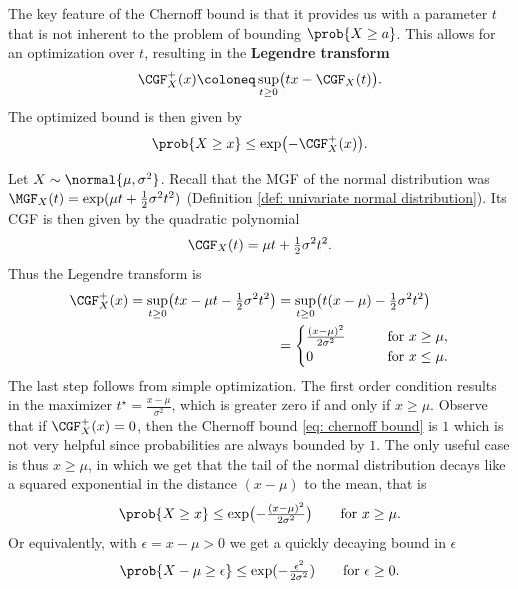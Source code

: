 The key feature of the Chernoff bound is that it provides us with a parameter \(t\)
that is not inherent to the problem of bounding \(\prob{X \ge a}\). This allows for
an optimization over \(t\), resulting in the \textbf{Legendre transform}
\[
    \CGF^+_X(x) \coloneq \sup_{t\ge 0} \bigl( t x - \CGF_X(t) \bigr).
\]
The optimized bound is then given by
\begin{equation}
    \label{eq: chernoff bound}    
    \prob{X \ge x} \le \exp\bigl(-\CGF^+_X(x)\bigr).
\end{equation}

\begin{example}
    \label{ex: chernoff bound for normal distribution}
    Let \(X \sim \normal{\mu, \sigma^2}\). 
    Recall that the MGF of the normal distribution was
    \(\MGF_X(t) = \exp(\mu t + \frac12 \sigma^2 t^2)\) (Definition \ref{def:
    univariate normal distribution}). Its CGF is then given by the quadratic
    polynomial
    \[
        \CGF_X(t) = \mu t + \tfrac12 \sigma^2 t^2.
    \]
    Thus the Legendre transform is
    \[\begin{aligned}
        \CGF_X^+(x)
        = \sup_{t\ge 0} \bigl(t x - \mu t - \tfrac12 \sigma^2 t^2\bigr)
        &= \sup_{t\ge 0} \bigl(t (x - \mu) - \tfrac12 \sigma^2 t^2\bigr)
        \\
        &= \begin{cases}
        \frac{(x - \mu)^2}{2\sigma^2}
        \qquad &\text{for } x \ge \mu,
        \\
        0 &\text{for } x \le \mu.
        \end{cases}
    \end{aligned}\]
    The last step follows from simple optimization. The first order condition
    results in the maximizer \(t^\star = \frac{x - \mu}{\sigma^2}\), which is greater
    zero if and only if \(x \ge \mu\).
    Observe that if \(\CGF_X^+(x) = 0\), then the Chernoff bound \eqref{eq: chernoff bound}
    is \(1\) which is not very helpful since probabilities are always bounded by \(1\).
    The only useful case is thus \(x \ge \mu\), in which we get that
    the tail of the normal distribution decays like a squared exponential in the
    distance \((x-\mu)\) to the mean, that is
    \[
        \prob{X \ge x}
        \le \exp\bigl(- \tfrac{(x - \mu)^2}{2\sigma^2}\bigr)
        \qquad\text{for } x \ge \mu.
    \]
    Or equivalently, with \(\epsilon = x - \mu > 0\) we get a quickly decaying bound in \(\epsilon\)
    \[
        \prob{X - \mu \ge \epsilon}
        \le \exp(-\tfrac{\epsilon^2}{2\sigma^2})
        \qquad\text{for } \epsilon \ge 0.
    \]
\end{example}

